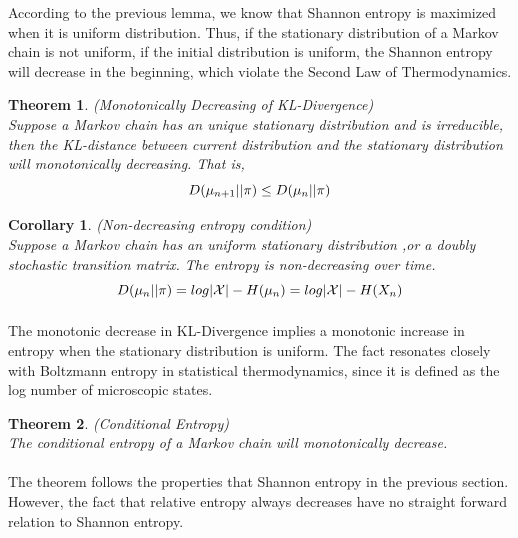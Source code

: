\documentclass[a4paper, 11pt]{article} %
\newtheorem*{theorem*}{Theorem}
\newtheorem*{corollary*}{Corollary}
\begin{document}
According to the previous lemma, we know that Shannon entropy is maximized when it is uniform distribution. Thus, if the stationary distribution of a Markov chain is not uniform, if the initial distribution is uniform, the Shannon entropy will decrease in the beginning, which violate the Second Law of Thermodynamics.

\begin{theorem*}
\emph{(Monotonically Decreasing of KL-Divergence)} \\
Suppose a Markov chain has an unique stationary distribution and is irreducible, then the KL-distance between current distribution and the stationary distribution will monotonically decreasing. That is,
\begin{equation*}
D(\mu_{n+1}||\pi)\leq D(\mu_n||\pi) \\
\end{equation*}
\end{theorem*}

\begin{corollary*}
\emph{(Non-decreasing entropy condition)} \\
Suppose a Markov chain has an uniform stationary distribution ,or  a doubly stochastic transition matrix. The entropy is non-decreasing over time.
\begin{equation*}
D(\mu_{n}||\pi)=log|\mathcal{X}|-H(\mu_{n})= log|\mathcal{X}|-H(X_{n})\\
\end{equation*}
\end{corollary*}

\paragraph{}
The  monotonic  decrease  in  KL-Divergence implies  a 
monotonic  increase  in  entropy when the stationary distribution is uniform. The  fact resonates closely with 
Boltzmann entropy in statistical thermodynamics, since it is defined as the log number of microscopic states.       

\begin{theorem*}
\emph{(Conditional Entropy)}\\
The conditional entropy of a Markov chain will monotonically decrease.
\end{theorem*}
\paragraph{}
The theorem follows the properties that Shannon entropy in the previous section. However, the fact that relative entropy always decreases have no straight forward relation to Shannon entropy.
\end{document}

